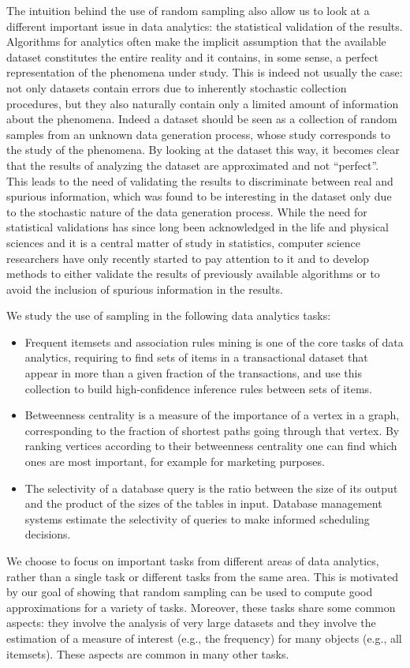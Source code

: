 The intuition behind the use of random sampling also allow us to look at a
different important issue in data analytics: the statistical validation of the
results. Algorithms for analytics often make the implicit assumption that the
available dataset constitutes the entire reality and it contains, in some sense,
a perfect representation of the phenomena under study. This is indeed not
usually the case: not only datasets contain errors due to inherently stochastic
collection procedures, but they also naturally contain only a limited amount of
information about the phenomena. Indeed a dataset should be seen as a collection
of random samples from an unknown data generation process, whose study
corresponds to the study of the phenomena. By looking at the dataset this way,
it becomes clear that the results of analyzing the dataset are approximated and
not ``perfect''. This leads to the need of validating the results to
discriminate between real and spurious information, which was found to be
interesting in the dataset only due to the stochastic nature of the data
generation process. While the need for statistical validations has since long
been acknowledged in the life and physical sciences and it is a central matter of
study in statistics, computer science researchers have only recently started to
pay attention to it and to develop methods to either validate the results of
previously available algorithms or to avoid the inclusion of spurious
information in the results.

We study the use of sampling in the following data analytics tasks:
\begin{itemize}
  \item Frequent itemsets and association rules mining is one of the core tasks
    of data analytics, requiring to find sets of items in a transactional
    dataset that appear in more than a given fraction of the transactions, and
    use this collection to build high-confidence inference rules between sets of
    items.
  \item Betweenness centrality is a measure of the importance of a vertex in a
    graph, corresponding to the fraction of shortest paths going through that
    vertex. By ranking vertices according to their betweenness centrality one
    can find which ones are most important, for example for marketing purposes.
  \item The selectivity of a database query is the ratio between the size of its
    output and the product of the sizes of the tables in input. Database
    management systems estimate the selectivity of queries to make informed
    scheduling decisions.
\end{itemize}
We choose to focus on important tasks from different areas of data analytics,
rather than a single task or different tasks from the same area. This is
motivated by our goal of showing that random sampling can be used to compute
good approximations for a variety of tasks. Moreover, these tasks share some
common aspects: they involve the analysis of very large datasets and they
involve the estimation of a measure of interest (e.g., the frequency) for many
objects (e.g., all itemsets). These aspects are common in many other tasks.

